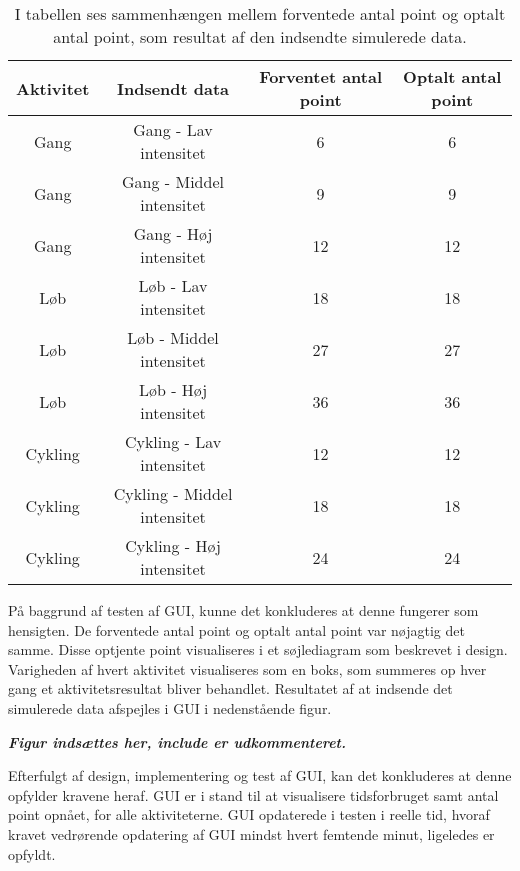 \begin{table}[H]
	\centering
	\begin{tabular}{cccc}
		\hline
		\rowcolor[HTML]{C0C0C0} 
		Aktivitet & Indsendt data & Forventet antal point & Optalt antal point \\ \hline
		Gang & Gang - Lav intensitet & 6 & 6 \\ \hline
		Gang & Gang - Middel intensitet & 9 & 9 \\ \hline
		Gang & Gang - Høj intensitet & 12 & 12 \\ \hline
		Løb & Løb - Lav intensitet & 18 & 18 \\ \hline
		Løb & Løb - Middel intensitet & 27 & 27 \\ \hline
		Løb & Løb - Høj intensitet & 36 & 36 \\ \hline
		Cykling & Cykling - Lav intensitet & 12 & 12 \\ \hline
		Cykling & Cykling - Middel intensitet & 18 & 18 \\ \hline
		Cykling & Cykling - Høj intensitet & 24 & 24 \\ \hline
	\end{tabular}
	\caption{I tabellen ses sammenhængen mellem forventede antal point og optalt antal point, som resultat af den indsendte simulerede data.}
	\label{test:GUI}
\end{table}\vspace{-.5cm}
På baggrund af testen af GUI, kunne det konkluderes at denne fungerer som hensigten. De forventede antal point og optalt antal point var nøjagtig det samme. Disse optjente point visualiseres i et søjlediagram som beskrevet i design. Varigheden af hvert aktivitet visualiseres som en boks, som summeres op hver gang et aktivitetsresultat bliver behandlet. Resultatet af at indsende det simulerede data afspejles i GUI i nedenstående figur.

\textit{\textbf{Figur indsættes her, include er udkommenteret.} }


Efterfulgt af design, implementering og test af GUI, kan det konkluderes at denne opfylder kravene heraf. GUI er i stand til at visualisere tidsforbruget samt antal point opnået, for alle aktiviteterne. GUI opdaterede i testen i reelle tid, hvoraf kravet vedrørende opdatering af GUI mindst hvert femtende minut, ligeledes er opfyldt.
